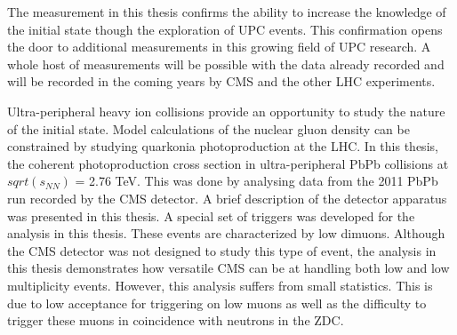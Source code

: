   The measurement in this thesis confirms the ability to increase the knowledge of the 
    initial state though the exploration of UPC events. 
  This confirmation opens the door to additional measurements in this growing field of UPC
    research.
  A whole host of measurements will be possible with the data already recorded and will be
    recorded in the coming years by CMS and the other LHC experiments. 

  Ultra-peripheral heavy ion collisions provide an opportunity to study 
    the nature of the initial state. 
  Model calculations of the nuclear gluon density can be constrained by 
    studying quarkonia photoproduction at the LHC.
  In this thesis, the coherent \JPsi{} photoproduction cross section in 
    ultra-peripheral PbPb collisions at $sqrt(s_{NN})$ = 2.76 TeV.
  This was done by analysing data from the 2011 PbPb run recorded by the CMS 
    detector.
  A brief description of the detector apparatus was presented in this thesis.
  A special set of triggers was developed for the analysis in this thesis.
  These events are characterized by low \pt{} dimuons.
  Although the CMS detector was not designed to study this type of event, the
    analysis in this thesis demonstrates how versatile CMS can be at handling 
    both low \pt{} and low multiplicity events. 
  However, this analysis suffers from small statistics. 
  This is due to low acceptance for triggering on low \pt{} muons as well as 
    the difficulty to trigger these muons in coincidence with neutrons in the 
    ZDC.
  
    
  
